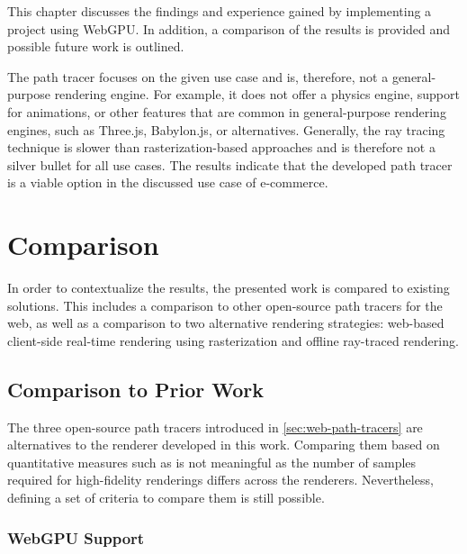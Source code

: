 
This chapter discusses the findings and experience gained by implementing a project using \gls{WebGPU}. In addition, a comparison of the results is provided and possible future work is outlined.

The path tracer focuses on the given use case and is, therefore, not a general-purpose rendering engine. For example, it does not offer a physics engine, support for animations, or other features that are common in general-purpose rendering engines, such as \gls{Three.js}, \gls{Babylon.js}, or alternatives. Generally, the ray tracing technique is slower than rasterization-based approaches and is therefore not a silver bullet for all use cases. The results indicate that the developed path tracer is a viable option in the discussed use case of e-commerce.

\section{Comparison}

In order to contextualize the results, the presented work is compared to existing solutions. This includes a comparison to other open-source path tracers for the web, as well as a comparison to two alternative rendering strategies: web-based client-side real-time rendering using rasterization and offline ray-traced rendering.

\subsection*{Comparison to Prior Work}
\label{sec:comparisonToPriorWork}

The three open-source path tracers introduced in \autoref{sec:web-path-tracers} are alternatives to the renderer developed in this work. Comparing them based on quantitative measures such as  is not meaningful as the number of samples required for high-fidelity renderings differs across the renderers. Nevertheless, defining a set of criteria to compare them is still possible.


\subsubsection*{WebGPU Support}

